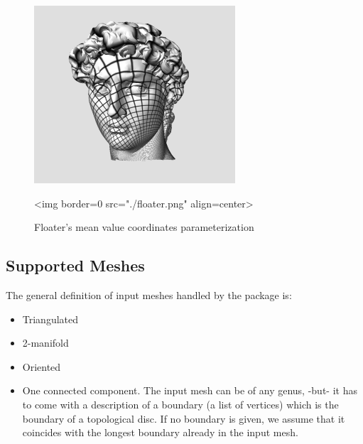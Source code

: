 \begin{figure}[bht]
    \begin{center}
        \begin{ccTexOnly}
            \includegraphics{Parameterization/floater} %
        \end{ccTexOnly}
        \begin{ccHtmlOnly}
            <img border=0 src="./floater.png" align=center>
        \end{ccHtmlOnly}
        \label{parameterization-fig-floater}

        \caption{Floater's mean value coordinates parameterization}
    \end{center}
\end{figure}


\subsection{Supported Meshes}

The general definition of input meshes handled by the package is:

\begin{itemize}

\item Triangulated

\item 2-manifold

\item Oriented

\item One connected component. The input mesh can be of any genus,
-but- it has to come with a description of a boundary (a list of
vertices) which is the boundary of
a topological disc. If no boundary is given, we assume that it
coincides with the longest boundary already in the input mesh.

\end{itemize}


